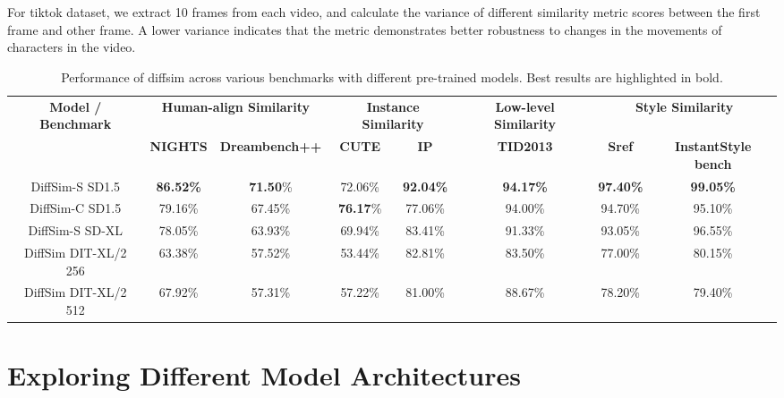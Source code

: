 For tiktok dataset, we extract 10 frames from each video, and calculate the variance of different similarity metric scores between the first frame and other frame. A lower variance indicates that the metric demonstrates better robustness to changes in the movements of characters in the video.

\begin{table*}[ht]
\centering
\caption{Performance of diffsim across various benchmarks with different pre-trained models. Best results are highlighted in bold.}
\label{tab:5}
\small 
\begin{tabular}{@{}c|cc|cc|c|cc@{}}
\toprule
\textbf{Model / Benchmark} & \multicolumn{2}{c|}{\textbf{Human-align Similarity}} & \multicolumn{2}{c|}{\textbf{Instance Similarity}} & \multicolumn{1}{c|}{\textbf{Low-level Similarity}} & \multicolumn{2}{c}{\textbf{Style Similarity}} \\ 
 & \textbf{NIGHTS} & \textbf{Dreambench++} & \textbf{CUTE} & \textbf{IP} & \textbf{TID2013} & \textbf{Sref}  & \textbf{InstantStyle bench} \\ \midrule
DiffSim-S SD1.5                     & \textbf{86.52\%} & \textbf{71.50}\% & 72.06\% & \textbf{92.04\%} & \textbf{94.17\%} & \textbf{97.40\%} & \textbf{99.05\%} \\
DiffSim-C SD1.5                      & 79.16\% & 67.45\% & \textbf{76.17}\% & 77.06\% & 94.00\% & 94.70\% & 95.10\% \\
DiffSim-S SD-XL                      & 78.05\% & 63.93\% & 69.94\% & 83.41\% & 91.33\% & 93.05\% & 96.55\% \\
DiffSim DIT-XL/2 256                 & 63.38\% & 57.52\% & 53.44\% & 82.81\% & 83.50\% & 77.00\% & 80.15\% \\
DiffSim DIT-XL/2 512                 & 67.92\% & 57.31\% & 57.22\% & 81.00\% & 88.67\% & 78.20\% & 79.40\% \\
\bottomrule
\end{tabular}
\end{table*}


\section{Exploring Different Model Architectures}

